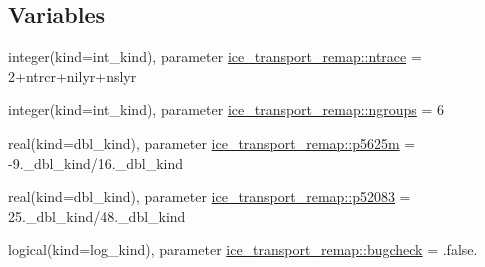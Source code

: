 \subsection*{Variables}
\begin{DoxyCompactItemize}
\item 
integer(kind=int\_\-kind), parameter \hyperlink{namespaceice__transport__remap_a5012cc594b512eddae2a80fd91132217}{ice\_\-transport\_\-remap::ntrace} = 2+ntrcr+nilyr+nslyr
\item 
integer(kind=int\_\-kind), parameter \hyperlink{namespaceice__transport__remap_a66c26988d6a99e211fdc9fd6cb9025c6}{ice\_\-transport\_\-remap::ngroups} = 6
\item 
real(kind=dbl\_\-kind), parameter \hyperlink{namespaceice__transport__remap_a4571153ae2d02f5b5251863d6bdabc37}{ice\_\-transport\_\-remap::p5625m} = -\/9.\_\-dbl\_\-kind/16.\_\-dbl\_\-kind
\item 
real(kind=dbl\_\-kind), parameter \hyperlink{namespaceice__transport__remap_a61fb7fc0ff741aea883e70089a6f0ea8}{ice\_\-transport\_\-remap::p52083} = 25.\_\-dbl\_\-kind/48.\_\-dbl\_\-kind
\item 
logical(kind=log\_\-kind), parameter \hyperlink{namespaceice__transport__remap_a2ea16fe2f40b061e8beaf561ebf7524c}{ice\_\-transport\_\-remap::bugcheck} = .false.
\end{DoxyCompactItemize}
